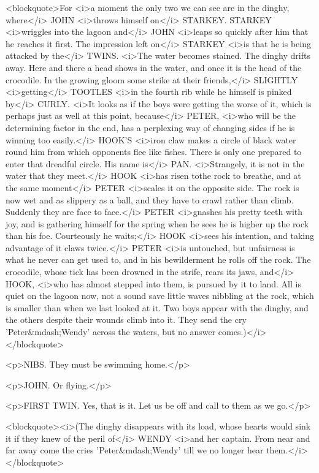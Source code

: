 <blockquote>For <i>a moment the only two we can see are in the
dinghy, where</i> JOHN <i>throws himself on</i> STARKEY. STARKEY
<i>wriggles into the lagoon and</i> JOHN <i>leaps so quickly after
him that he reaches it first. The impression left on</i> STARKEY
<i>is that he is being attacked by the</i> TWINS. <i>The water
becomes stained. The dinghy drifts away. Here and there a head shows
in the water, and once it is the head of the crocodile. In the
growing gloom some strike at their friends,</i> SLIGHTLY
<i>getting</i> TOOTLES <i>in the fourth rib while he himself is
pinked by</i> CURLY. <i>It looks as if the boys were getting the
worse of it, which is perhaps just as well at this point, because</i>
PETER, <i>who will be the determining factor in the end, has a
perplexing way of changing sides if he is winning too easily.</i>
HOOK'S <i>iron claw makes a circle of black water round him from
which opponents flee like fishes. There is only one prepared to enter
that dreadful circle. His name is</i> PAN. <i>Strangely, it is not in
the water that they meet.</i> HOOK <i>has risen tothe rock to
breathe, and at the same moment</i> PETER <i>scales it on the
opposite side. The rock is now wet and as slippery as a ball, and
they have to crawl rather than climb. Suddenly they are face to
face.</i> PETER <i>gnashes his pretty teeth with joy, and is
gathering himself for the spring when he sees he is higher up the
rock than his foe. Courteously he waits;</i> HOOK <i>sees his
intention, and taking advantage of it claws twice.</i> PETER <i>is
untouched, but unfairness is what he never can get used to, and in
his bewilderment he rolls off the rock. The crocodile, whose tick has
been drowned in the strife, rears its jaws, and</i> HOOK, <i>who has
almost stepped into them, is pursued by it to land. All is quiet on
the lagoon now, not a sound save little waves nibbling at the rock,
which is smaller than when we last looked at it. Two boys appear with
the dinghy, and the others despite their wounds climb into it. They
send the cry 'Peter&mdash;Wendy' across the waters, but no answer
comes.)</i></blockquote>

<p>NIBS. They must be swimming home.</p>

<p>JOHN. Or flying.</p>

<p>FIRST TWIN. Yes, that is it. Let us be off and call to them as we
go.</p>

<blockquote><i>(The dinghy disappears with its load, whose hearts
would sink it if they knew of the peril of</i> WENDY <i>and her
captain. From near and far away come the cries 'Peter&mdash;Wendy'
till we no longer hear them.</i></blockquote>

